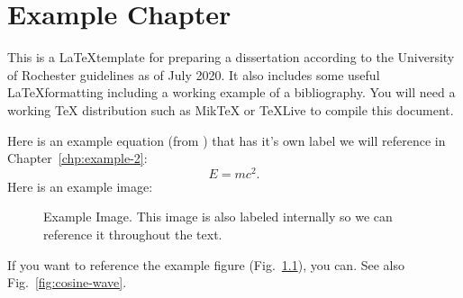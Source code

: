 \documentclass[\main/master.tex]{subfiles}
\begin{document}
\chapter{Example Chapter}\label{chp:example-1}
\doublespacing
\hspace{5 mm} This is a \LaTeX template for preparing a dissertation according to the University of Rochester guidelines \cite{uofr_guidelines} as of July 2020. It also includes some useful \LaTeX formatting including a working example of a bibliography. You will need a working TeX distribution such as MikTeX \cite{miktex_home} or TeXLive \cite{texlive_nodate} to compile this document.  \par
Here is an example equation (from \cite{einstein1905tragheit}) that has it's own label we will reference in Chapter~\ref{chp:example-2}:
\begin{equation}
E=mc^{2}.\label{eqn:energy-mass-equivalence-relation}
\end{equation}
Here is an example image:
\begin{figure}[htbp]
	\centering
	\caption[Example Image]{Example Image. This image is also labeled internally so we can reference it throughout the text.}
	\label{fig:sine-wave}
\end{figure}
If you want to reference the example figure (Fig.~\ref{fig:sine-wave}), you can. See also Fig.~\ref{fig:cosine-wave}.
\end{document}
